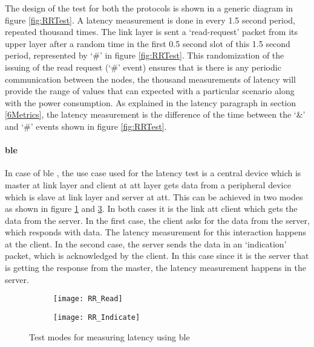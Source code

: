 The design of the test for both the protocols is shown in a generic diagram in figure \ref{fig:RRTest}. A latency measurement is done in every 1.5 second period, repeated thousand times. The link layer is sent a `read-request' packet from its upper layer after a random time in the first 0.5 second slot of this 1.5 second period, represented by `\#' in figure \ref{fig:RRTest}. This randomization of the issuing of the read request (`\#' event) ensures that is there is any periodic communication between the nodes, the thousand measurements of latency will provide the range of values that can expected with a particular scenario along with the power consumption. As explained in the latency paragraph in section \ref{6Metrics}, the latency measurement is the difference of the time between the `\&' and `\#' events shown in figure \ref{fig:RRTest}.


\paragraph{\gls{ble} }
In case of \gls{ble} , the use case used for the latency test is a central device which is master at link layer and client at \gls{att} layer gets data from a peripheral device which is slave at link layer and server at \gls{att}. This can be achieved in two modes as shown in figure \ref{fig:RR_Read} and \ref{fig:RR_Indicate}. In both cases it is the link \gls{att} client which gets the data from the server. In the first case, the client asks for the data from the server, which responds with data. The latency measurement for this interaction happens at the client. In the second case, the server sends the data in an `indication' packet, which is acknowledged by the client. In this case since it is the server that is getting the response from the master, the latency measurement happens in the server.

\begin{figure}[h]
	\vspace{10 pt}
	\begin{subfigure}[t]{0.49\linewidth}
		\centering
		\texttt{[image: RR\_Read]}
		\label{fig:RR_Read}
	\end{subfigure}
	\begin{subfigure}[t]{0.49\linewidth}
		\centering
		\texttt{[image: RR\_Indicate]}
		\label{fig:RR_Indicate}
	\end{subfigure}
	\caption{Test modes for measuring latency using \gls{ble}}
\end{figure}

